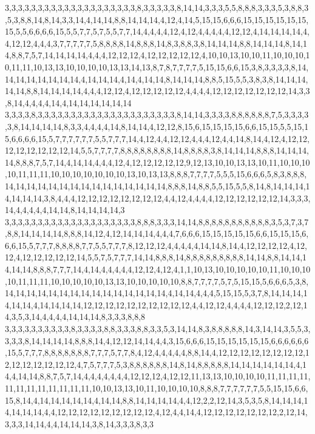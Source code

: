 3,3,3,3,3,3,3,3,3,3,3,3,3,3,3,3,3,3,3,3,8,3,3,3,3,3,8,14,14,3,3,3,5,5,8,8,8,3,3,3,5,3,8,8,3,5,3,8,8,14,8,14,3,3,14,4,14,14,8,8,14,14,14,4,12,4,14,5,15,15,6,6,6,15,15,15,15,15,15,15,5,5,6,6,6,6,15,5,5,7,7,5,7,5,5,7,7,14,4,4,4,4,12,4,12,4,4,4,4,4,12,12,4,14,14,14,14,4,4,12,12,4,4,4,3,7,7,7,7,7,5,8,8,8,8,14,8,8,8,14,8,3,8,8,3,8,14,14,14,8,8,14,14,14,8,14,14,8,8,7,5,7,14,14,14,14,4,4,4,12,12,12,4,12,12,12,12,12,4,10,10,13,10,10,11,10,10,10,10,11,11,10,13,13,10,10,10,10,13,13,14,13,8,7,8,7,7,7,7,5,15,15,6,6,15,3,8,3,3,3,3,8,14,14,14,14,14,14,14,14,4,14,14,14,4,14,4,14,14,8,14,14,14,8,8,5,15,5,5,3,8,3,8,14,14,14,14,14,8,8,14,14,14,14,4,4,4,12,12,4,12,12,12,12,12,4,4,4,4,12,12,12,12,12,12,12,14,3,3,8,14,4,4,4,4,14,4,14,14,14,14,14,14
3,3,3,3,8,3,3,3,3,3,3,3,3,3,3,3,3,3,3,3,3,3,3,3,3,3,8,14,14,3,3,3,3,8,8,8,8,8,8,7,5,3,3,3,3,3,8,14,14,14,14,8,3,3,4,4,4,4,14,8,14,14,4,12,12,8,15,6,15,15,15,15,6,6,15,15,5,5,15,15,6,6,6,6,15,5,7,7,7,7,7,7,5,5,7,7,7,14,4,12,4,4,12,12,4,4,4,12,4,4,14,8,14,4,12,4,12,12,12,12,12,12,12,12,14,5,5,7,7,7,7,8,8,8,8,8,8,8,8,14,8,8,8,8,3,8,14,14,14,8,8,8,14,14,14,14,8,8,8,7,5,7,14,4,14,14,4,4,4,12,4,12,12,12,12,12,9,12,13,10,10,13,13,10,11,10,10,10,10,11,11,11,10,10,10,10,10,10,10,13,10,13,13,8,8,8,7,7,7,7,5,5,5,15,6,6,6,5,8,3,8,8,8,14,14,14,14,14,14,14,14,14,14,14,14,14,14,14,8,8,8,14,8,8,5,5,15,5,5,8,14,8,14,14,14,14,14,14,14,3,8,4,4,4,12,12,12,12,12,12,12,12,4,4,12,4,4,4,4,12,12,12,12,12,12,14,3,3,3,14,4,4,4,4,4,14,14,8,14,14,14,14,3
3,3,3,3,3,3,3,3,3,3,3,3,3,3,3,3,3,3,3,3,8,8,8,3,3,3,14,14,8,8,8,8,8,8,8,8,8,8,8,3,5,3,7,3,7,8,8,14,14,14,14,8,8,8,14,12,4,12,14,14,14,4,4,4,7,6,6,6,15,15,15,15,15,6,6,15,15,15,6,6,6,15,5,7,7,7,8,8,8,8,7,7,5,5,7,7,7,8,12,12,12,4,4,4,4,4,14,14,8,14,4,12,12,12,12,4,12,12,4,12,12,12,12,12,14,5,5,7,5,7,7,7,14,14,8,8,8,14,8,8,8,8,8,8,8,8,8,14,14,8,8,14,14,14,14,14,8,8,8,7,7,7,14,4,14,4,4,4,4,4,12,12,4,12,4,1,1,10,13,10,10,10,10,10,11,10,10,10,10,11,11,11,10,10,10,10,10,13,13,10,10,10,10,10,8,8,7,7,7,7,5,7,5,15,15,5,6,6,6,5,3,8,14,14,14,14,14,14,14,14,14,14,14,14,14,14,14,4,14,14,4,4,4,5,15,15,5,3,7,8,14,14,14,14,14,14,4,14,14,14,14,12,12,12,12,12,12,12,12,12,12,4,4,12,12,4,4,4,4,12,12,12,2,12,14,3,5,3,14,4,4,4,4,14,14,14,8,3,3,3,8,8,8
3,3,3,3,3,3,3,3,3,3,8,3,3,3,3,8,8,3,3,3,8,8,3,3,5,3,14,14,8,3,8,8,8,8,8,14,3,14,14,3,5,5,3,3,3,3,8,14,14,14,14,8,8,8,14,4,12,12,14,14,4,4,3,15,6,6,6,15,15,15,15,15,15,6,6,6,6,6,6,15,5,7,7,7,8,8,8,8,8,8,8,7,7,7,5,7,7,8,4,12,4,4,4,4,4,8,8,14,4,12,12,12,12,12,12,12,12,12,12,12,12,12,12,12,4,7,5,7,7,7,5,3,8,8,8,8,8,8,14,8,14,8,8,8,8,8,14,14,14,14,14,14,4,14,4,14,14,8,8,7,5,7,14,4,4,4,4,4,4,4,12,12,12,4,12,12,11,13,13,10,10,10,10,11,11,11,11,11,11,11,11,11,11,11,11,10,10,13,13,10,11,10,10,10,10,8,8,8,7,7,7,7,7,7,5,5,15,15,6,6,15,8,14,4,14,14,14,14,14,4,14,14,8,8,14,14,14,14,4,4,12,2,2,12,14,3,5,3,5,8,14,14,14,14,14,14,14,4,4,12,12,12,12,12,12,12,12,12,4,12,4,4,14,4,12,12,12,12,12,12,12,2,12,14,3,3,3,14,14,4,4,14,14,14,3,8,14,3,3,3,8,3,3
